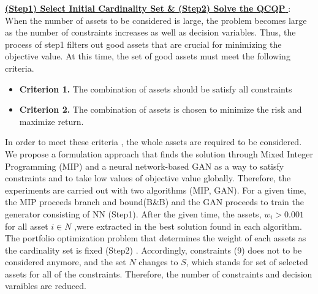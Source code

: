 \documentclass[11pt]{article}
\begin{document}
	\underline{\textbf{(Step1) Select Initial Cardinality Set \& (Step2) Solve the QCQP }} :
	When the number of assets to be considered is large, the problem becomes large as the number of constraints increases as well as decision variables. 
	Thus, the process of step1 filters out good assets that are crucial for minimizing the objective value. At this time, the set of good assets must meet the following criteria.
	\begin{itemize}
		\item[]\textbf{Criterion 1.} The combination of assets should be satisfy all constraints
		\item[]\textbf{Criterion 2.} The combination of assets is chosen to minimize the risk and maximize return.
	\end{itemize}
	In order to meet these criteria , the whole assets are required to be considered. We propose a formulation approach that finds the solution through Mixed Integer Programming (MIP) and a neural network-based GAN as a way to satisfy constraints and to take low values of objective value globally. Therefore, the experiments are carried out with two algorithms (MIP, GAN). For a given time, the MIP proceeds branch and bound(B\&B) and the GAN proceeds to train the generator consisting of NN (Step1). After the given time, the assets, $w_i> 0.001$ for all asset $i \in N$ ,were extracted in the best solution found in each algorithm. The portfolio optimization problem that determines the weight of each assets as the cardinality set is fixed (Step2) . Accordingly, constraints (9) does not to be considered anymore, and the set $N$ changes to $S$, which stands for set of selected assets for all of the constraints. Therefore, the number of constraints and decision varaibles are reduced. 
\end{document}
